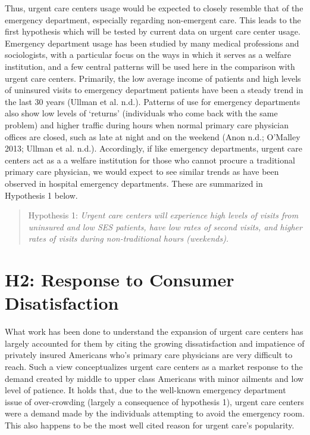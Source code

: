\documentclass[12pt,twoside]{reedthesis}
\begin{document}
  Thus, urgent care centers usage would be expected to closely resemble
  that of the emergency department, especially regarding non-emergent
  care. This leads to the first hypothesis which will be tested by current
  data on urgent care center usage. Emergency department usage has been
  studied by many medical professions and sociologists, with a particular
  focus on the ways in which it serves as a welfare institution, and a few
  central patterns will be used here in the comparison with urgent care
  centers. Primarily, the low average income of patients and high levels
  of uninsured visits to emergency department patients have been a steady
  trend in the last 30 years (Ullman et al. n.d.). Patterns of use for
  emergency departments also show low levels of `returns' (individuals who
  come back with the same problem) and higher traffic during hours when
  normal primary care physician offices are closed, such as late at night
  and on the weekend (Anon n.d.; O'Malley 2013; Ullman et al. n.d.).
  Accordingly, if like emergency departments, urgent care centers act as a
  a welfare institution for those who cannot procure a traditional primary
  care physician, we would expect to see similar trends as have been
  observed in hospital emergency departments. These are summarized in
  Hypothesis 1 below.
  
  \begin{quote}
  Hypothesis 1: \emph{Urgent care centers will experience high levels of
  visits from uninsured and low SES patients, have low rates of second
  visits, and higher rates of visits during non-traditional hours
  (weekends).}
  \end{quote}
  
  \section*{H2: Response to Consumer
  Disatisfaction}\label{h2-response-to-consumer-disatisfaction}
  
  What work has been done to understand the expansion of urgent care
  centers has largely accounted for them by citing the growing
  dissatisfaction and impatience of privately insured Americans who's
  primary care physicians are very difficult to reach. Such a view
  conceptualizes urgent care centers as a market response to the demand
  created by middle to upper class Americans with minor ailments and low
  level of patience. It holds that, due to the well-known emergency
  department issue of over-crowding (largely a consequence of hypothesis
  1), urgent care centers were a demand made by the individuals attempting
  to avoid the emergency room. This also happens to be the most well cited
  reason for urgent care's popularity.
  
\end{document}
